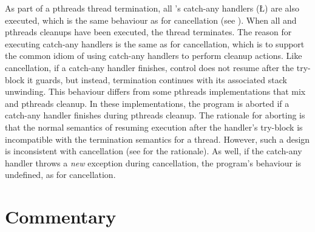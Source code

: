 \documentclass[openright,twoside]{report}
\begin{document}
As part of a pthreads thread termination, all \CC's catch-any handlers (\LGinlinetrue\LGbegin\lgrinde\L{}\endlgrinde\LGend{}) are also executed, which is the same behaviour as for \uC cancellation (see ).
When all \CC and pthreads cleanups have been executed, the thread terminates.
The reason for executing catch-any handlers is the same as for \uC cancellation, which is to support the common \CC idiom of using catch-any handlers to perform cleanup actions.
Like \uC cancellation, if a catch-any handler finishes, control does not resume after the try-block it guards, but instead, termination continues with its associated stack unwinding.
This behaviour differs from some pthreads implementations that mix \CC and pthreads cleanup.
In these implementations, the program is aborted if a catch-any handler finishes during pthreads cleanup.
The rationale for aborting is that the normal semantics of resuming execution after the handler's try-block is incompatible with the termination semantics for a thread.
However, such a design is inconsistent with \uC cancellation (see  for the rationale).
As well, if the catch-any handler throws a \emph{new} exception during cancellation, the program's behaviour is undefined, as for \uC cancellation.


\section{Commentary}
\end{document}
